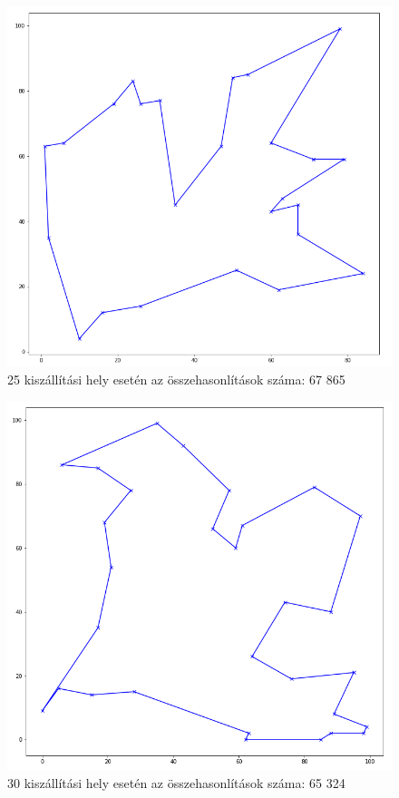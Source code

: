 \begin{figure}[h!]
\centering
\includegraphics[scale=0.4]{images/25.png}
\caption{25 kiszállítási hely esetén az összehasonlítások száma: 67 865}
\label{fig:tsp25location}
\end{figure}

\begin{figure}[h!]
\centering
\includegraphics[scale=0.4]{images/30.png}
\caption{30 kiszállítási hely esetén az összehasonlítások száma: 65 324}
\label{fig:tsp30location}
\end{figure}

